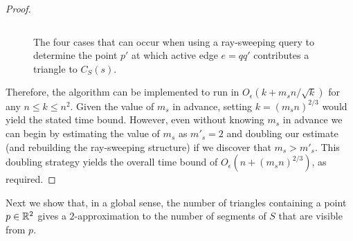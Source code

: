\documentclass{patmorin}
\newcommand{\Oe}{O_\epsilon}
\begin{document}
\begin{proof}
\begin{figure}
\begin{center}
\begin{tabular}{cccc}
    \end{tabular}
  \end{center}
  \caption{The four cases that can occur when using a ray-sweeping query
           to determine the point $p'$ at which active edge
           $e=qq'$ contributes a triangle to $C_S(s)$.}
\end{figure}

Therefore, the algorithm can be implemented to run in $\Oe(k +
m_sn/\sqrt{k})$ for any $n\le k\le n^2$.  Given the value of $m_s$
in advance, setting $k=(m_s n)^{2/3}$ would yield the stated time
bound.  However, even without knowing $m_s$ in advance we can begin by
estimating the value of $m_s$ as $m'_s = 2$ and doubling our estimate
(and rebuilding the ray-sweeping structure) if we discover that $m_s >
m'_s$.  This doubling strategy yields the overall time bound of $\Oe(n+(m_s
n)^{2/3})$, as required.
\end{proof}

Next we show that, in a global sense, the number of triangles containing a
point $p\in\mathbb{R}^2$ gives a $2$-approximation to the number of segments of $S$
that are visible from $p$.
\end{document}
